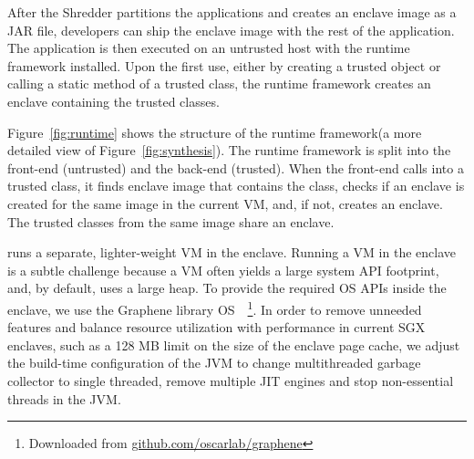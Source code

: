 After the Shredder partitions the applications
and creates an enclave image as a JAR file,
developers can ship the enclave image with the rest of the application.
The application is then executed on an untrusted host with the 
\systemname{} runtime framework installed.
Upon the first use, either by creating a trusted object or calling a static method of a trusted class,
the \systemname{} runtime framework creates an enclave containing the trusted classes.


Figure~\ref{fig:runtime} shows the structure of the \systemname{} runtime framework(a more detailed view of Figure~\ref{fig:synthesis}).
The \systemname{} runtime framework is split into the front-end (untrusted) and the back-end (trusted).
When the front-end calls into a trusted class,
it finds enclave image that contains the class,
checks if an enclave is created for the same image in the current \java{} VM,
and, if not, creates an enclave.
The trusted classes from the same image share an enclave.

\systemname{} runs a separate, lighter-weight \java{} VM in the enclave.
Running a \java{} VM in the enclave is a subtle challenge because a \java{} VM
often yields a large system API footprint, and, by default, uses a large heap. %
To provide the required OS APIs inside the enclave, we use the Graphene library OS~\citep{tsai14graphene}~\footnote{Downloaded from \url{github.com/oscarlab/graphene}}.
In order to remove unneeded features and balance resource utilization with performance in current SGX enclaves, such as
a 128 MB limit on the size of the enclave page cache,
we adjust the build-time configuration of the JVM to change multithreaded garbage collector to single threaded, remove multiple JIT engines and stop non-essential threads in the JVM. 



